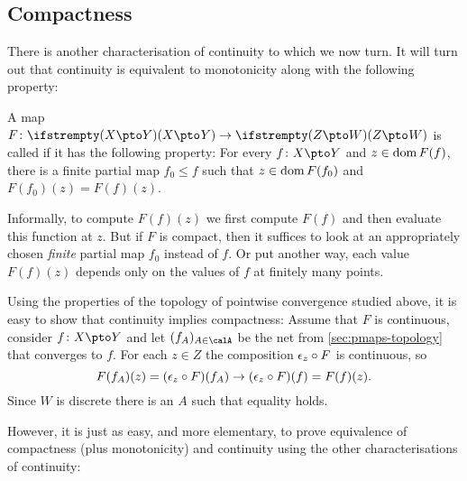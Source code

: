 

\subsection{Compactness}

There is another characterisation of continuity to which we now turn. It will turn out that continuity is equivalent to monotonicity along with the following property:

\begin{definition}[Compactness]
    \label{def:compact-map}
    A map $F \colon \pmaps{X}{Y} \to \pmaps{Z}{W}$ is called  if it has the following property: For every $f \colon X \pto Y$ and $z \in \dom F(f)$, there is a finite partial map $f_0 \leq f$ such that $z \in \dom F(f_0)$ and $F(f_0)(z) = F(f)(z)$.
\end{definition}
%
Informally, to compute $F(f)(z)$ we first compute $F(f)$ and then evaluate this function at $z$. But if $F$ is compact, then it suffices to look at an appropriately chosen \emph{finite} partial map $f_0$ instead of $f$. Or put another way, each value $F(f)(z)$ depends only on the values of $f$ at finitely many points.

Using the properties of the topology of pointwise convergence studied above, it is easy to show that continuity implies compactness: Assume that $F$ is continuous, consider $f \colon X \pto Y$ and let $(f_A)_{A \in \calA}$ be the net from \cref{sec:pmaps-topology} that converges to $f$. For each $z \in Z$ the composition $\ev[z] \circ F$ is continuous, so
%
\begin{equation*}
    F(f_A)(z)
        = (\ev[z] \circ F)(f_A)
        \to (\ev[z] \circ F)(f)
        = F(f)(z).
\end{equation*}
%
Since $W$ is discrete there is an $A$ such that equality holds.

However, it is just as easy, and more elementary, to prove equivalence of compactness (plus monotonicity) and continuity using the other characterisations of continuity:

